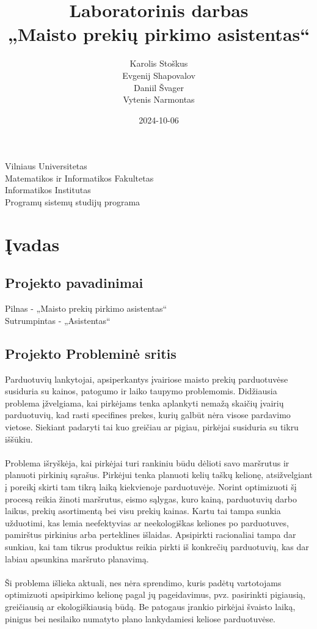 \documentclass{article}
\title{ Laboratorinis darbas \\„Maisto prekių pirkimo asistentas“}
\date{2024-10-06}
\author{Karolis Stoškus\\Evgenij Shapovalov\\Daniil Švager\\Vytenis Narmontas}
\begin{document}
\maketitle
\vfill
{\large{Vilniaus Universitetas\\Matematikos ir Informatikos Fakultetas\\Informatikos Institutas\\Programų sistemų studijų programa}}
	\pagebreak
	
\tableofcontents
	\pagebreak

\section{Įvadas}
\subsection{Projekto pavadinimai}
	Pilnas - „Maisto prekių pirkimo asistentas“\\
	Sutrumpintas - „Asistentas“
\subsection{Projekto Probleminė sritis}
	Parduotuvių lankytojai, apsiperkantys įvairiose maisto prekių parduotuvėse susiduria su kainos, patogumo ir laiko taupymo problemomis. Didžiausia problema įžvelgiama, kai pirkėjams tenka aplankyti nemažą skaičių įvairių parduotuvių, kad rasti specifines prekes, kurių galbūt nėra visose pardavimo vietose. Siekiant padaryti tai kuo greičiau ar pigiau, pirkėjai susiduria su tikru iššūkiu.\\\\
	Problema išryškėja,  kai pirkėjai turi rankiniu būdu dėlioti savo maršrutus ir planuoti  pirkinių sąrašus. Pirkėjui tenka planuoti kelių taškų kelionę, atsižvelgiant į poreikį skirti tam tikrą laiką kiekvienoje parduotuvėje. Norint optimizuoti šį procesą reikia žinoti maršrutus, eismo sąlygas, kuro kainą, parduotuvių darbo laikus, prekių asortimentą bei visu prekių kainas. Kartu tai tampa sunkia užduotimi, kas lemia neefektyvias ar neekologiškas keliones po parduotuves, pamirštus pirkinius arba perteklines išlaidas. Apsipirkti racionaliai tampa dar sunkiau, kai tam tikrus produktus reikia pirkti iš konkrečių parduotuvių, kas dar labiau apsunkina maršruto planavimą.\\\\
	Ši problema išlieka aktuali, nes nėra sprendimo, kuris padėtų vartotojams optimizuoti apsipirkimo kelionę pagal jų pageidavimus, pvz. pasirinkti pigiausią, greičiausią ar ekologiškiausią būdą. Be patogaus įrankio pirkėjai švaisto laiką, pinigus bei nesilaiko numatyto plano lankydamiesi keliose parduotuvėse.
	\pagebreak
\end{document}
